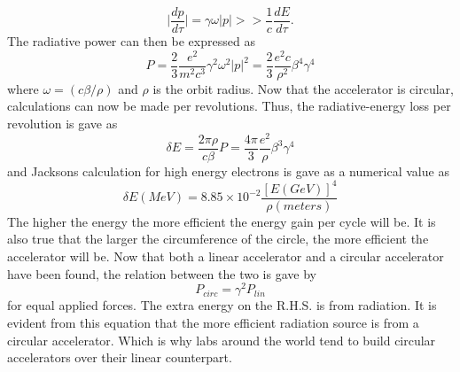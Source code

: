 \documentclass[a4paper]{article}
\begin{document}
\begin{equation}
\Big|\frac{dp}{d \tau}\Big| = \gamma \omega |p| >> \frac{1}{c} \frac{dE}{d\tau}.
\end{equation}
The radiative power can then be expressed as
\begin{equation}
    P = \frac{2}{3} \frac{e^{2}}{m^{2} c^{3}} \gamma^{2} \omega^{2} |p|^{2} = \frac{2}{3} \frac{e^{2} c}{\rho^{2}} \beta^{4} \gamma^{4}
\end{equation}
where $\omega = (c\beta/\rho)$ and $\rho$ is the orbit radius. Now that the accelerator is circular, calculations can now be made per revolutions. Thus, the radiative-energy loss per revolution is gave as
\begin{equation}
\delta E = \frac{2 \pi \rho}{c \beta} P = \frac{4 \pi}{3} \frac{e^{2}}{\rho} \beta^{3} \gamma^{4}
\end{equation}
and Jacksons calculation for high energy electrons is gave as a numerical value as
\begin{equation}
    \delta E(MeV) = 8.85 \times 10^{-2} \frac{[E(GeV)]^{4}}{\rho(meters)}
\end{equation}
The higher the energy the more efficient the energy gain per cycle will be. It is also true that the larger the circumference of the circle, the more efficient the accelerator will be. 
Now that both a linear accelerator and a circular accelerator have been found, the relation between the two is gave by
$$
P_{circ} = \gamma^{2} P_{lin}
$$
for equal applied forces. The extra energy on the R.H.S. is from radiation. It is evident from this equation that the more efficient radiation source is from a circular accelerator. Which is why labs around the world tend to build circular accelerators over their linear counterpart.
%

\end{document}
